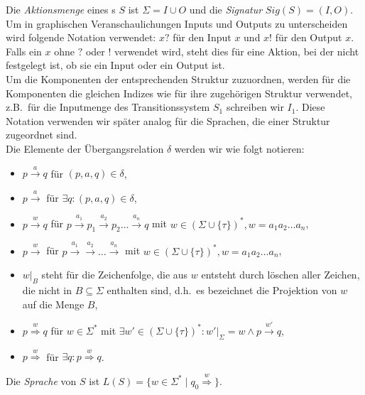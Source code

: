 Die \emph{Aktionsmenge} eines \EIO{}s $S$ ist $\Sigma = I\cup O$ und die
\emph{Signatur} $Sig(S)=(I,O)$.\\
Um in graphischen Veranschaulichungen Inputs und Outputs zu unterscheiden wird
folgende Notation verwendet: $x?$ für den Input $x$ und $x!$ für den Output
$x$. Falls ein $x$ ohne $?$ oder $!$ verwendet wird, steht dies für eine
Aktion, bei der nicht festgelegt ist, ob sie ein Input oder ein Output ist.\\
Um die Komponenten der entsprechenden Struktur zuzuordnen, werden für
die Komponenten die gleichen Indizes wie für ihre zugehörigen Struktur
verwendet, z.B.\ für die Inputmenge des Transitionssystem $S_1$ schreiben wir $I_1$.
Diese Notation verwenden wir später analog für die Sprachen, die einer Struktur
zugeordnet sind.\\
Die Elemente der Übergangsrelation $\delta$ werden wir wie folgt notieren:
\begin{itemize}
  \item $p\overset{a}{\rightarrow} q$ für $(p,a,q)\in\delta$,
  \item $p\overset{a}{\rightarrow}$ für $\exists q: (p,a,q)\in\delta$,
  \item $p\overset{w}{\rightarrow} q$ für $p \overset{a_1}{\rightarrow} p_1
    \overset{a_2}{\rightarrow} p_2\dots \overset{a_n}{\rightarrow} q$ mit $w\in
    (\Sigma\cup\{\tau\})^*, w=a_1a_2\dots a_n$,
  \item $p\overset{w}{\rightarrow}$ für $p \overset{a_1}{\rightarrow}
    \overset{a_2}{\rightarrow} \dots \overset{a_n}{\rightarrow}$ mit $w\in
    (\Sigma\cup\{\tau\})^*, w=a_1a_2\dots a_n$,
  \item $w|_B$ steht für die Zeichenfolge, die aus $w$ entsteht durch löschen
    aller Zeichen, die nicht in $B\subseteq\Sigma$ enthalten sind, d.h.\ es
    bezeichnet die Projektion von $w$ auf die Menge $B$,
  \item $p\overset{w}{\Rightarrow} q$ für $w\in\Sigma^*$ mit $\exists
    w'\in(\Sigma\cup\{\tau\})^*:w'|_{\Sigma}=w\wedge p\overset{w'}{\rightarrow}
    q$,
  \item $p\overset{w}{\Rightarrow}$ für $\exists q:p\overset{w}{\Rightarrow}
    q$.
\end{itemize}
Die \emph{Sprache} von $S$ ist
$L(S)=\{w\in\Sigma^*\mid q_0\overset{w}{\Rightarrow}\}$.

